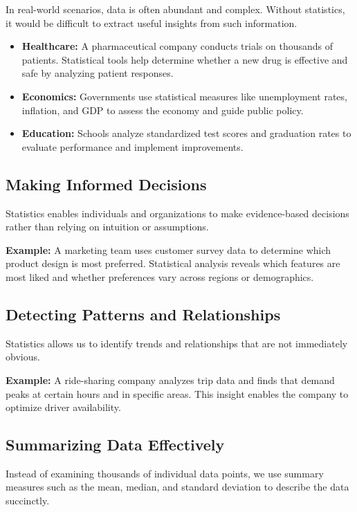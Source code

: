 In real-world scenarios, data is often abundant and complex. Without statistics, it would be difficult to extract useful insights from such information.

\begin{itemize}
  \item \textbf{Healthcare:} A pharmaceutical company conducts trials on thousands of patients. Statistical tools help determine whether a new drug is effective and safe by analyzing patient responses.
  \item \textbf{Economics:} Governments use statistical measures like unemployment rates, inflation, and GDP to assess the economy and guide public policy.
  \item \textbf{Education:} Schools analyze standardized test scores and graduation rates to evaluate performance and implement improvements.
\end{itemize}

\subsection{Making Informed Decisions}

Statistics enables individuals and organizations to make evidence-based decisions rather than relying on intuition or assumptions.

\textbf{Example:} A marketing team uses customer survey data to determine which product design is most preferred. Statistical analysis reveals which features are most liked and whether preferences vary across regions or demographics.

\subsection{Detecting Patterns and Relationships}

Statistics allows us to identify trends and relationships that are not immediately obvious.

\textbf{Example:} A ride-sharing company analyzes trip data and finds that demand peaks at certain hours and in specific areas. This insight enables the company to optimize driver availability.

\subsection{Summarizing Data Effectively}

Instead of examining thousands of individual data points, we use summary measures such as the mean, median, and standard deviation to describe the data succinctly.

